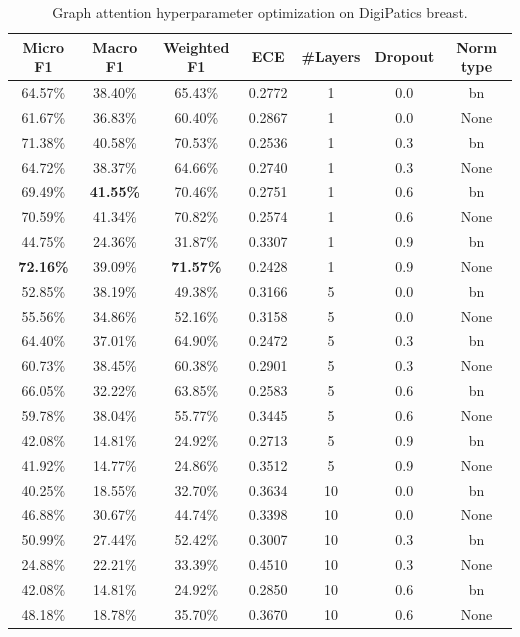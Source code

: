 \begin{table}[ht]
    \centering
    \caption{Graph attention hyperparameter optimization on DigiPatics breast.}
\begin{tabular}{|c|c|c|c|c|c|c|}
\hline
Micro F1 & Macro F1 & Weighted F1 & ECE & \#Layers & Dropout & Norm type\\ \hline
64.57\% & 38.40\% & 65.43\% & 0.2772 & 1 & 0.0 & bn\\ \hline
61.67\% & 36.83\% & 60.40\% & 0.2867 & 1 & 0.0 & None\\ \hline
71.38\% & 40.58\% & 70.53\% & 0.2536 & 1 & 0.3 & bn\\ \hline
64.72\% & 38.37\% & 64.66\% & 0.2740 & 1 & 0.3 & None\\ \hline
69.49\% & \textbf{41.55\%} & 70.46\% & 0.2751 & 1 & 0.6 & bn\\ \hline
70.59\% & 41.34\% & 70.82\% & 0.2574 & 1 & 0.6 & None\\ \hline
44.75\% & 24.36\% & 31.87\% & 0.3307 & 1 & 0.9 & bn\\ \hline
\textbf{72.16\%} & 39.09\% & \textbf{71.57\%} & 0.2428 & 1 & 0.9 & None\\ \hline
52.85\% & 38.19\% & 49.38\% & 0.3166 & 5 & 0.0 & bn\\ \hline
55.56\% & 34.86\% & 52.16\% & 0.3158 & 5 & 0.0 & None\\ \hline
64.40\% & 37.01\% & 64.90\% & 0.2472 & 5 & 0.3 & bn\\ \hline
60.73\% & 38.45\% & 60.38\% & 0.2901 & 5 & 0.3 & None\\ \hline
66.05\% & 32.22\% & 63.85\% & 0.2583 & 5 & 0.6 & bn\\ \hline
59.78\% & 38.04\% & 55.77\% & 0.3445 & 5 & 0.6 & None\\ \hline
42.08\% & 14.81\% & 24.92\% & 0.2713 & 5 & 0.9 & bn\\ \hline
41.92\% & 14.77\% & 24.86\% & 0.3512 & 5 & 0.9 & None\\ \hline
40.25\% & 18.55\% & 32.70\% & 0.3634 & 10 & 0.0 & bn\\ \hline
46.88\% & 30.67\% & 44.74\% & 0.3398 & 10 & 0.0 & None\\ \hline
50.99\% & 27.44\% & 52.42\% & 0.3007 & 10 & 0.3 & bn\\ \hline
24.88\% & 22.21\% & 33.39\% & 0.4510 & 10 & 0.3 & None\\ \hline
42.08\% & 14.81\% & 24.92\% & 0.2850 & 10 & 0.6 & bn\\ \hline
48.18\% & 18.78\% & 35.70\% & 0.3670 & 10 & 0.6 & None\\ \hline

\end{tabular}
\end{table}
